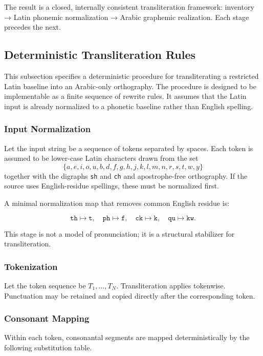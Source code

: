 \documentclass[12pt]{article}
\begin{document}
The result is a closed, internally consistent transliteration framework: inventory → Latin phonemic normalization → Arabic graphemic realization. Each stage precedes the next.

\subsection{Deterministic Transliteration Rules}

This subsection specifies a deterministic procedure for transliterating a restricted Latin baseline into an Arabic-only orthography. The procedure is designed to be implementable as a finite sequence of rewrite rules. It assumes that the Latin input is already normalized to a phonetic baseline rather than English spelling.

\subsubsection{Input Normalization}

Let the input string be a sequence of tokens separated by spaces. Each token is assumed to be lower-case Latin characters drawn from the set
\[
\{a,e,i,o,u,b,d,f,g,h,j,k,l,m,n,r,s,t,w,y\}
\]
together with the digraphs \texttt{sh} and \texttt{ch} and apostrophe-free orthography. If the source uses English-residue spellings, these must be normalized first.

A minimal normalization map that removes common English residue is:

\[
\texttt{th} \mapsto \texttt{t},\quad
\texttt{ph} \mapsto \texttt{f},\quad
\texttt{ck} \mapsto \texttt{k},\quad
\texttt{qu} \mapsto \texttt{kw}.
\]

This stage is not a model of pronunciation; it is a structural stabilizer for transliteration.

\subsubsection{Tokenization}

Let the token sequence be $T_1,\dots,T_N$. Transliteration applies tokenwise. Punctuation may be retained and copied directly after the corresponding token.

\subsubsection{Consonant Mapping}

Within each token, consonantal segments are mapped deterministically by the following substitution table.
\end{document}
